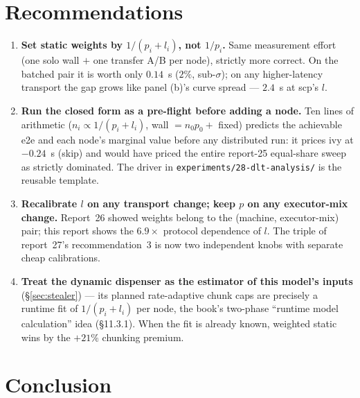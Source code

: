 \documentclass[
	english,
	letterpaper, oneside
]{article}
\begin{document}
\section{Recommendations}
\label{sec:recommendations}

\begin{enumerate}
  \item \textbf{Set static weights by $1/(p_i + l_i)$, not $1/p_i$.} Same
        measurement effort (one solo wall $+$ one transfer A/B per node),
        strictly more correct. On the batched pair it is worth only
        $0.14$~s ($2\%$, sub-$\sigma$); on any higher-latency transport
        the gap grows like panel (b)'s curve spread --- $2.4$~s at scp's
        $l$.
  \item \textbf{Run the closed form as a pre-flight before adding a
        node.} Ten lines of arithmetic ($n_i \propto 1/(p_i + l_i)$,
        wall $= n_0 p_0 +$ fixed) predicts the achievable e2e and each
        node's marginal value before any distributed run: it prices ivy
        at $-0.24$~s (skip) and would have priced the entire report-25
        equal-share sweep as strictly dominated. The driver in
        \texttt{experiments/28-dlt-analysis/} is the reusable template.
  \item \textbf{Recalibrate $l$ on any transport change; keep $p$ on any
        executor-mix change.} Report~26 showed weights belong to the
        (machine, executor-mix) pair; this report shows the $6.9\times$
        protocol dependence of $l$. The triple of report~27's
        recommendation~3 is now two independent knobs with separate
        cheap calibrations.
  \item \textbf{Treat the dynamic dispenser as the estimator of this
        model's inputs} (\S\ref{sec:stealer}) --- its planned
        rate-adaptive chunk caps are precisely a runtime fit of
        $1/(p_i + l_i)$ per node, the book's two-phase ``runtime model
        calculation'' idea (\S11.3.1). When the fit is already known,
        weighted static wins by the $+21\%$ chunking premium.
\end{enumerate}

\section{Conclusion}
\label{sec:conclusion}
\end{document}

